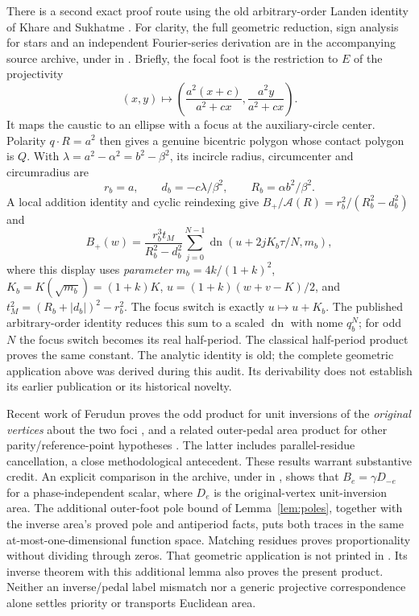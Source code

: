 \documentclass[11pt]{article}
\newcommand{\dn}{\operatorname{dn}}
\newcommand{\Area}{\mathcal A}
\begin{document}
There is a second exact proof route using the old arbitrary-order Landen
identity of Khare and Sukhatme \cite[equation (7), p.~923; Section 2.1]{KS}.
For clarity, the full geometric reduction, sign analysis for stars and
an independent Fourier-series derivation are in the accompanying source
archive, under 
in . Briefly, the focal foot is the
restriction to $E$ of the projectivity
\[
 (x,y)\longmapsto
 \left(\frac{a^2(x+c)}{a^2+cx},\frac{a^2y}{a^2+cx}\right).
\]
It maps the caustic to an ellipse with a focus at the auxiliary-circle
center. Polarity $q\cdot R=a^2$ then gives a genuine bicentric polygon
whose contact polygon is $Q$. With $\lambda=a^2-\alpha^2=b^2-\beta^2$,
its incircle radius, circumcenter and circumradius are
\[
 r_b=a,\qquad d_b=-c\lambda/\beta^2,\qquad R_b=\alpha b^2/\beta^2.
\]
A local addition identity and cyclic reindexing give
$B_+/\Area(R)=r_b^2/(R_b^2-d_b^2)$ and
\[
 B_+(w)=\frac{r_b^3t_M}{R_b^2-d_b^2}
 \sum_{j=0}^{N-1}\dn(u+2jK_b\tau/N,m_b),
\]
where this display uses \emph{parameter}
$m_b=4k/(1+k)^2$, $K_b=K(\sqrt{m_b})=(1+k)K$,
$u=(1+k)(w+v-K)/2$, and $t_M^2=(R_b+|d_b|)^2-r_b^2$.
The focus switch is exactly $u\mapsto u+K_b$.
The published arbitrary-order identity reduces this sum to a scaled
$\dn$ with nome $q_b^N$; for odd $N$ the focus switch becomes its
real half-period. The classical half-period product proves the same
constant. The analytic identity is old; the complete geometric
application above was derived during this audit. Its derivability does
not establish its earlier publication or its historical novelty.

Recent work of Ferudun proves the odd product for unit inversions of the
\emph{original vertices} about the two foci \cite{F62}, and a related
outer-pedal area product for other parity/reference-point hypotheses
\cite{F14}. The latter includes parallel-residue cancellation, a close
methodological antecedent. These results warrant substantive credit.
An explicit comparison in the archive,
under 
in , shows that $B_e=\gamma D_{-e}$ for a
phase-independent scalar, where $D_e$ is the original-vertex unit-inversion
area. The additional outer-foot pole bound of Lemma~\ref{lem:poles},
together with the inverse area's proved pole and antiperiod facts,
puts both traces in the same at-most-one-dimensional function space.
Matching residues proves proportionality without dividing through zeros.
That geometric application is not printed in \cite{F62}. Its inverse
theorem with this additional lemma also proves the present product.
Neither an inverse/pedal label mismatch nor a generic projective
correspondence alone settles priority or transports Euclidean area.
\end{document}
